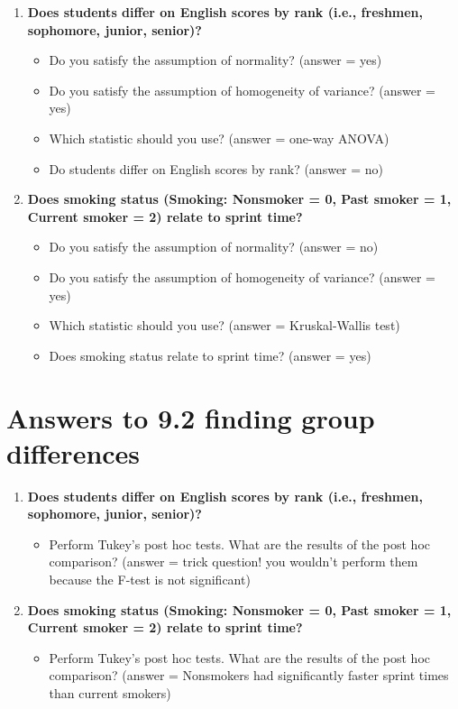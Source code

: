 \documentclass[
]{book}
\providecommand{\tightlist}{%
  \setlength{\itemsep}{0pt}\setlength{\parskip}{0pt}}
\begin{document}
\begin{enumerate}
\def\labelenumi{\arabic{enumi}.}
\item
  \textbf{Does students differ on English scores by rank (i.e., freshmen, sophomore, junior, senior)?}

  \begin{itemize}
  \item
    Do you satisfy the assumption of normality? (answer = yes)
  \item
    Do you satisfy the assumption of homogeneity of variance? (answer = yes)
  \item
    Which statistic should you use? (answer = one-way ANOVA)
  \item
    Do students differ on English scores by rank? (answer = no)
  \end{itemize}
\item
  \textbf{Does smoking status (Smoking: Nonsmoker = 0, Past smoker = 1, Current smoker = 2) relate to sprint time?}

  \begin{itemize}
  \item
    Do you satisfy the assumption of normality? (answer = no)
  \item
    Do you satisfy the assumption of homogeneity of variance? (answer = yes)
  \item
    Which statistic should you use? (answer = Kruskal-Wallis test)
  \item
    Does smoking status relate to sprint time? (answer = yes)
  \end{itemize}
\end{enumerate}

\hypertarget{answers-to-9.2-finding-group-differences}{%
\section{Answers to 9.2 finding group differences}\label{answers-to-9.2-finding-group-differences}}

\begin{enumerate}
\def\labelenumi{\arabic{enumi}.}
\item
  \textbf{Does students differ on English scores by rank (i.e., freshmen, sophomore, junior, senior)?}

  \begin{itemize}
  \tightlist
  \item
    Perform Tukey's post hoc tests. What are the results of the post hoc comparison? (answer = trick question! you wouldn't perform them because the F-test is not significant)
  \end{itemize}
\item
  \textbf{Does smoking status (Smoking: Nonsmoker = 0, Past smoker = 1, Current smoker = 2) relate to sprint time?}

  \begin{itemize}
  \tightlist
  \item
    Perform Tukey's post hoc tests. What are the results of the post hoc comparison? (answer = Nonsmokers had significantly faster sprint times than current smokers)
  \end{itemize}
\end{enumerate}
\end{document}
